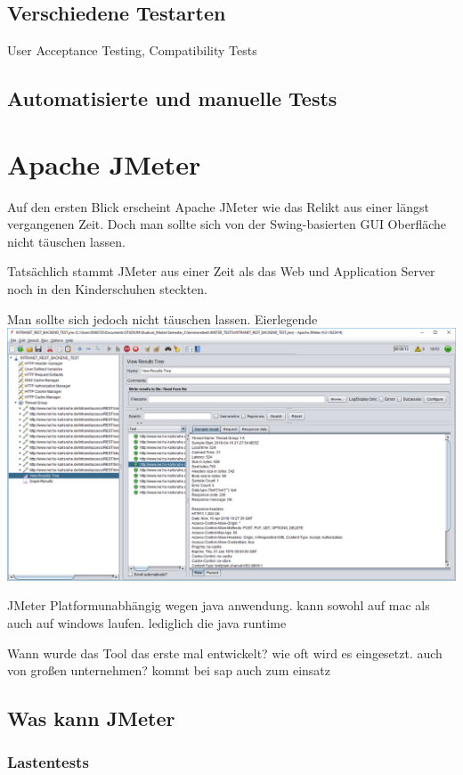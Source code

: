 \documentclass[a4paper,12pt]{article}
\begin{document}
\subsection{Verschiedene Testarten}
User Acceptance Testing, Compatibility Tests
\subsection{Automatisierte und manuelle Tests}


\section{Apache JMeter}
Auf den ersten Blick erscheint Apache JMeter wie das Relikt aus einer längst vergangenen Zeit. Doch man sollte sich von der Swing-basierten GUI Oberfläche nicht täuschen lassen. 

Tatsächlich stammt JMeter aus einer Zeit als das Web und Application Server noch in den Kinderschuhen steckten.


Man sollte sich jedoch nicht täuschen lassen. Eierlegende  
\includegraphics[width=1\textwidth]{bilder/jmeter_1.png}\par\vspace{1cm}
JMeter Platformunabhängig wegen java anwendung. kann sowohl auf mac als auch auf windows laufen. lediglich die java runtime

Wann wurde das Tool das erste mal entwickelt? wie oft wird es eingesetzt. auch von großen unternehmen? kommt bei sap auch zum einsatz

\subsection{Was kann JMeter}

\subsubsection{Lastentests}
\end{document}
